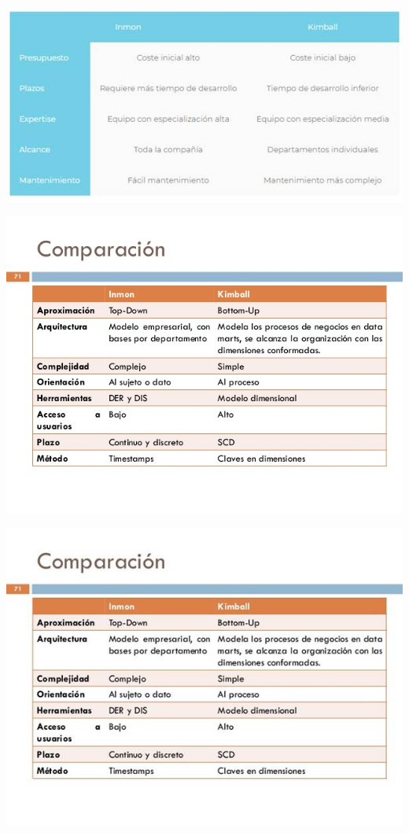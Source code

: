 \begin{center}
\includegraphics[width=15cm]{./Imagenes/image014}
\end{center}

\begin{center}
\includegraphics[width=15cm]{./Imagenes/image015}
\end{center}

\begin{center}
\includegraphics[width=15cm]{./Imagenes/image016}
\end{center}

